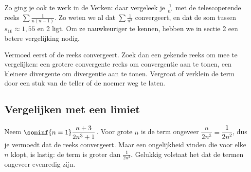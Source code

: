 Zo ging je ook te werk in de Verken: daar vergeleek je $\tfrac1{n^2}$ met de telescoperende reeks $\sum \tfrac{1}{n(n-1)}$. Zo weten we al dat $\sum \tfrac1{n^2}$ convergeert, en dat de som tussen $s_{10} \approx 1{,}55$ en 2 ligt. Om ze nauwkeuriger te kennen, hebben we in sectie 2 een betere vergelijking nodig.


\begin{werkwijze}
Vermoed eerst of de reeks convergeert. Zoek dan een gekende reeks om mee te vergelijken: een grotere convergente reeks om convergentie aan te tonen, een kleinere divergente om divergentie aan te tonen. Vergroot of verklein de term door een stuk van de teller of de noemer weg te laten.
\end{werkwijze}


\begin{oefeningen}
\end{oefeningen}

\subsection{Vergelijken met een limiet}

Neem $\sominf{n=1} \dfrac{n + 3}{2n^3 + 1}$. Voor grote $n$ is de term ongeveer $\dfrac{n}{2n^3} = \dfrac{1}{2n^2}$, dus je vermoedt dat de reeks convergeert. Maar een ongelijkheid vinden die voor elke $n$ klopt, is lastig: de term is groter dan $\tfrac{1}{2n^2}$. Gelukkig volstaat het dat de termen ongeveer evenredig zijn.

